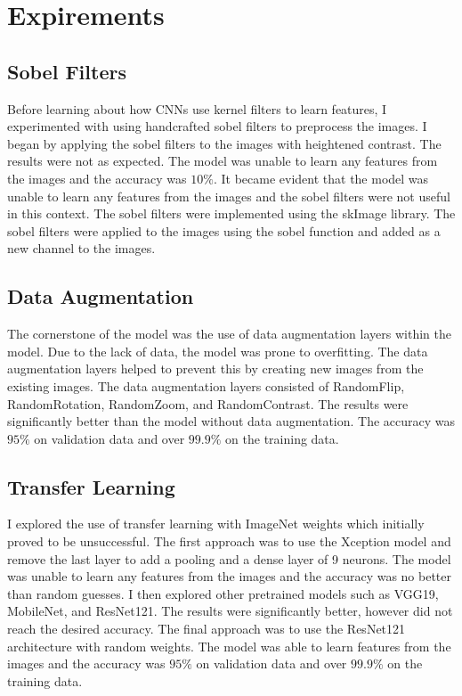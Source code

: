 \documentclass[conference]{IEEEtran}
\begin{document}
\section{Expirements}

\subsection{Sobel Filters}
Before learning about how CNNs use kernel filters to learn features, I experimented with using handcrafted sobel filters to preprocess the images. I began by applying the sobel filters to the images with heightened contrast. The results were not as expected. The model was unable to learn any features from the images and the accuracy was $10\%$. It became evident that the model was unable to learn any features from the images and the sobel filters were not useful in this context. The sobel filters were implemented using the skImage library. The sobel filters were applied to the images using the sobel function and added as a new channel to the images.

\subsection{Data Augmentation}
The cornerstone of the model was the use of data augmentation layers within the model. Due to the lack of data, the model was prone to overfitting. The data augmentation layers helped to prevent this by creating new images from the existing images. The data augmentation layers consisted of RandomFlip, RandomRotation, RandomZoom, and RandomContrast. The results were significantly better than the model without data augmentation. The accuracy was $95\%$ on validation data and over $99.9\%$ on the training data.

\subsection{Transfer Learning}
I explored the use of transfer learning with ImageNet weights which initially proved to be unsuccessful. The first approach was to use the Xception model and remove the last layer to add a pooling and a dense layer of 9 neurons. The model was unable to learn any features from the images and the accuracy was no better than random guesses. I then explored other pretrained models such as VGG19, MobileNet, and ResNet121. The results were significantly better, however did not reach the desired accuracy. The final approach was to use the ResNet121 architecture with random weights. The model was able to learn features from the images and the accuracy was $95\%$ on validation data and over $99.9\%$ on the training data.
\end{document}
